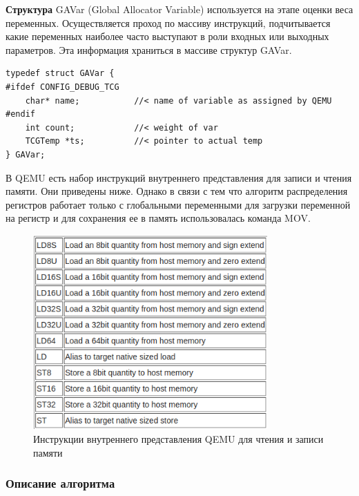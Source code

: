 \textbf{Структура}
GAVar (Global Allocator Variable) используется на этапе оценки веса переменных. Осуществляется проход по массиву инструкций, подчитывается какие переменных наиболее часто выступают в роли входных или выходных параметров. Эта информация храниться в массиве структур GAVar.

\begin{small}
\begin{verbatim}
typedef struct GAVar {
#ifdef CONFIG_DEBUG_TCG
    char* name;           //< name of variable as assigned by QEMU
#endif
    int count;            //< weight of var
    TCGTemp *ts;          //< pointer to actual temp
} GAVar;
\end{verbatim}
\end{small}


В QEMU есть набор инструкций внутреннего представления для записи и чтения памяти. Они приведены ниже. Однако в связи с тем что алгоритм распределения регистров работает только с глобальными переменными для загрузки переменной на регистр и для сохранения ее в память использовалась команда MOV.

\begin{figure}[h!]
    \centering
    \includegraphics[width=0.8\textwidth]{table_load_store.png}
    \caption{Инструкции внутреннего представления QEMU для чтения и записи памяти}
\end{figure}



\subsubsection{Описание алгоритма}

